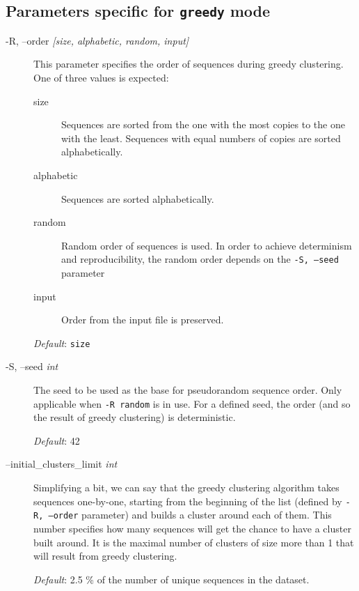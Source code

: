 \documentclass[11pt, a4paper, twoside, titlepage]{article}
\begin{document}
\subsection{Parameters specific for \texttt{greedy} mode}
\label{parametersGreedy}
\begin{description}

\item[-R, --order \rm \textlangle \textit{[size, alphabetic, random, input]}\textrangle] This parameter specifies the order of sequences during greedy clustering. One of three values is expected: 
\begin{description}
	\item[size] Sequences are sorted from the one with the most copies to the one with the least. Sequences with equal numbers of copies are sorted alphabetically. 
	\item[alphabetic] Sequences are sorted alphabetically.
	\item[random] Random order of sequences is used. In order to achieve determinism and reproducibility, the random order depends on the \texttt{-S, --seed} parameter
	\item[input] Order from the input file is preserved.
\end{description}
\textit{Default}: \texttt{size}

\item[-S, --seed \rm \textlangle \textit{int}\textrangle] The seed to be used as the base for pseudorandom sequence order. Only applicable when \texttt{-R random} is in use. For a defined seed, the order (and so the result of greedy clustering) is deterministic.

\textit{Default}: 42

\item[--initial\_clusters\_limit \rm \textlangle \textit{int}\textrangle] Simplifying a bit, we can say that the greedy clustering algorithm takes sequences one-by-one, starting from the beginning of the list (defined by \texttt{-R, --order} parameter) and builds a cluster around each of them. This number specifies how many sequences will get the chance to have a cluster built around. It is the maximal number of clusters of size more than 1 that will result from greedy clustering.

\textit{Default}: 2.5 \% of the number of unique sequences in the dataset.

\end{description}
\end{document}
